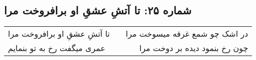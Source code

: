 \begin{center}
\section*{شماره ۲۵: تا آتشِ عشقِ او برافروخت مرا}
\label{sec:025}
\begin{longtable}{l p{0.5cm} r}
تا آتشِ عشقِ او برافروخت مرا
&&
در اشک چو شمع غرقه میسوخت مرا
\\
عمری میگفت رخ به تو بنمایم
&&
چون رخ بنمود دیده بر دوخت مرا
\\
\end{longtable}
\end{center}

